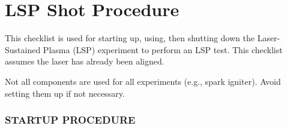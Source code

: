 \section*{LSP Shot Procedure}\label{lsp-shot-procedure}

This checklist is used for starting up, using, then shutting down the
Laser-Sustained Plasma (LSP) experiment to perform an LSP test. This
checklist assumes the laser has already been aligned.

Not all components are used for all experiments (e.g., spark igniter).
Avoid setting them up if not necessary.

\subsubsection{STARTUP PROCEDURE}\label{startup-procedure}


